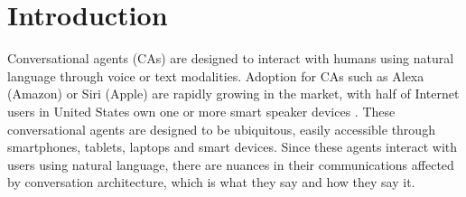 \documentclass[sigconf,screen,review, anonymous]{acmart}
\begin{document}
\section{Introduction}

Conversational agents (CAs) are designed to interact with humans using natural language through voice or text modalities. Adoption for CAs such as Alexa (Amazon) or Siri (Apple) are rapidly growing in the market, with half of Internet users in United States own one or more smart speaker devices \cite{2022comscore}. These conversational agents are designed to be ubiquitous, easily accessible through smartphones, tablets, laptops and smart devices. Since these agents interact with users using natural language, there are nuances in their communications affected by conversation architecture, which is what they say and how they say it.

\end{document}
